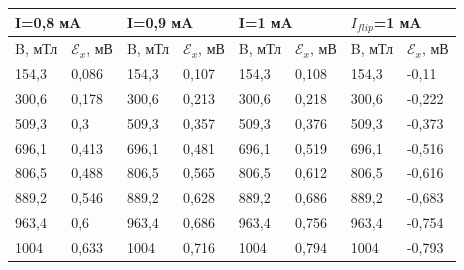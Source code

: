 \documentclass[a4paper,12pt]{article}
\begin{document}
\begin{table}[!ht]
\centering
\begin{tabular}{|ll|ll|ll|ll|}
\hline
\multicolumn{2}{|l|}{I=0,8 мA}                     & \multicolumn{2}{l|}{I=0,9 мA}                     & \multicolumn{2}{l|}{I=1 мA}                       & \multicolumn{2}{l|}{$I_{flip}$=1 мA}              \\ \hline
\multicolumn{1}{|l|}{B, мТл} & $\mathcal{E}_x$, мВ & \multicolumn{1}{l|}{B, мТл} & $\mathcal{E}_x$, мВ & \multicolumn{1}{l|}{B, мТл} & $\mathcal{E}_x$, мВ & \multicolumn{1}{l|}{B, мТл} & $\mathcal{E}_x$, мВ \\ \hline
\multicolumn{1}{|l|}{154,3}  & 0,086               & \multicolumn{1}{l|}{154,3}  & 0,107               & \multicolumn{1}{l|}{154,3}  & 0,108               & \multicolumn{1}{l|}{154,3}  & -0,11               \\ \hline
\multicolumn{1}{|l|}{300,6}  & 0,178               & \multicolumn{1}{l|}{300,6}  & 0,213               & \multicolumn{1}{l|}{300,6}  & 0,218               & \multicolumn{1}{l|}{300,6}  & -0,222              \\ \hline
\multicolumn{1}{|l|}{509,3}  & 0,3                 & \multicolumn{1}{l|}{509,3}  & 0,357               & \multicolumn{1}{l|}{509,3}  & 0,376               & \multicolumn{1}{l|}{509,3}  & -0,373              \\ \hline
\multicolumn{1}{|l|}{696,1}  & 0,413               & \multicolumn{1}{l|}{696,1}  & 0,481               & \multicolumn{1}{l|}{696,1}  & 0,519               & \multicolumn{1}{l|}{696,1}  & -0,516              \\ \hline
\multicolumn{1}{|l|}{806,5}  & 0,488               & \multicolumn{1}{l|}{806,5}  & 0,565               & \multicolumn{1}{l|}{806,5}  & 0,612               & \multicolumn{1}{l|}{806,5}  & -0,616              \\ \hline
\multicolumn{1}{|l|}{889,2}  & 0,546               & \multicolumn{1}{l|}{889,2}  & 0,628               & \multicolumn{1}{l|}{889,2}  & 0,686               & \multicolumn{1}{l|}{889,2}  & -0,683              \\ \hline
\multicolumn{1}{|l|}{963,4}  & 0,6                 & \multicolumn{1}{l|}{963,4}  & 0,686               & \multicolumn{1}{l|}{963,4}  & 0,756               & \multicolumn{1}{l|}{963,4}  & -0,754              \\ \hline
\multicolumn{1}{|l|}{1004}   & 0,633               & \multicolumn{1}{l|}{1004}   & 0,716               & \multicolumn{1}{l|}{1004}   & 0,794               & \multicolumn{1}{l|}{1004}   & -0,793              \\ \hline
\end{tabular}
\end{table}
\end{document}
